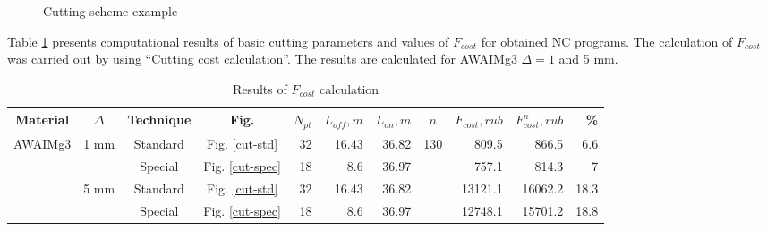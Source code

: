 \documentclass[runningheads]{llncs}
\begin{document}
\begin{figure}
  \centering
  \caption{Cutting scheme example}
  \label{cutting}
\end{figure}

Table \ref{f-cost}
presents computational results of basic cutting parameters and values of $F_{cost}$
for obtained NC programs.
The calculation of $F_{cost}$
was carried out by using ``Cutting cost calculation''.
The results are calculated for AWAIMg3 $\Delta = 1$ and 5 mm.

\begin{table}
  \begin{tabular}{c | c | c | c | r r r | c | r r | r}
  Material & $\Delta$ & Technique & Fig. & $N_{pt}$ & $L_{off}, m$ & $L_{on}, m$ & $n$ & $F_{cost}, rub$ & $F^n_{cost}, rub$ & \% \\
  \hline \hline
  \multirow{4}{*}{AWAIMg3} & \multirow{2}{*}{1 mm} & Standard & Fig. \ref{cut-std}     & 32  & 16.43   & 36.82 & \multirow{4}{*}{130} & 809.5 & 866.5 & 6.6 \\
                         &                    & Special  & Fig. \ref{cut-spec} & 18  & 8.6  & 36.97 &                      & 757.1 & 814.3 & 7 \\
                         & \multirow{2}{*}{5 mm} & Standard & Fig. \ref{cut-std}  & 32 & 16.43 & 36.82 &                    & 13121.1 & 16062.2 & 18.3 \\
                         &                    & Special  & Fig. \ref{cut-spec}  & 18 & 8.6 & 36.97 &                      & 12748.1 & 15701.2 & 18.8 \\
  \hline
  \end{tabular}
  \caption{Results of $F_{cost}$ calculation}
  \label{f-cost}
\end{table}
\end{document}
